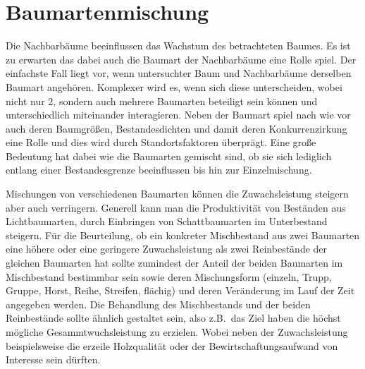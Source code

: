 \documentclass[twocolumn]{scrartcl}
\begin{document}
\section{Baumartenmischung}

Die Nachbarbäume beeinflussen das Wachstum des betrachteten Baumes. Es ist zu
erwarten das dabei auch die Baumart der Nachbarbäume eine Rolle spiel. Der
einfachste Fall liegt vor, wenn untersuchter Baum und Nachbarbäume derselben
Baumart angehören. Komplexer wird es, wenn sich diese unterscheiden, wobei nicht
nur 2, sondern auch mehrere Baumarten beteiligt sein können und unterschiedlich
miteinander interagieren. Neben der Baumart spiel nach wie vor auch deren
Baumgrößen, Bestandesdichten und damit deren Konkurrenzirkung eine Rolle und
dies wird durch Standortsfaktoren überprägt. Eine große Bedeutung hat dabei wie
die Baumarten gemischt sind, ob sie sich lediglich entlang einer Bestandesgrenze
beeinflussen bis hin zur Einzelmischung.

Mischungen von verschiedenen Baumarten können die Zuwachsleistung steigern aber
auch verringern. Generell kann man die Produktivität von Beständen aus
Lichtbaumarten, durch Einbringen von Schattbaumarten im Unterbestand steigern.
Für die Beurteilung, ob ein konkreter Mischbestand aus zwei Baumarten eine
höhere oder eine geringere Zuwachsleistung als zwei Reinbestände der gleichen
Baumarten hat sollte zumindest der Anteil der beiden Baumarten im Mischbestand
bestimmbar sein sowie deren Mischungsform (einzeln, Trupp, Gruppe, Horst, Reihe,
Streifen, flächig) und deren Veränderung im Lauf der Zeit angegeben werden. Die
Behandlung des Mischbestands und der beiden Reinbestände sollte ähnlich
gestaltet sein, also z.B.\ das Ziel haben die höchst mögliche
Gesammtwuchsleistung zu erzielen. Wobei neben der Zuwachsleistung beispielsweise
die erzeile Holzqualität oder der Bewirtschaftungsaufwand von Interesse sein
dürften.




\end{document}

